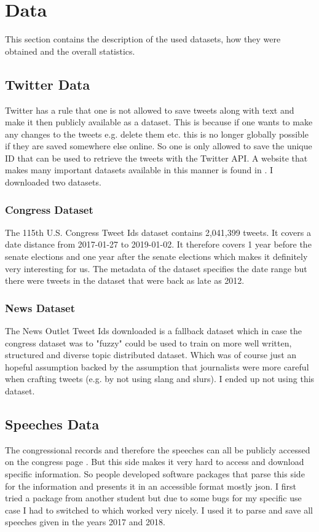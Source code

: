 \documentclass[10pt,conference,compsocconf]{IEEEtran}
\begin{document}
\section{Data}
\label{sec:Data}
This section contains the description of the used datasets, how they were obtained and the overall statistics. 
\subsection{Twitter Data}
Twitter has a rule that one is not allowed to save tweets along with text and make it then publicly available as a dataset. This is because if one wants to make any changes to the tweets e.g. delete them etc. this is no longer globally possible if they are saved somewhere else online. So one is only allowed to save the unique ID that can be used to retrieve the tweets with the Twitter API. A website that makes many important datasets available in this manner is found in  \cite{twitter_datasets}. I downloaded two datasets.
\subsubsection{Congress Dataset}
The 115th U.S. Congress Tweet Ids dataset contains 2,041,399 tweets. It covers a date distance from 2017-01-27 to 2019-01-02. It therefore covers 1 year before the senate elections and one year after the senate elections which makes it definitely very interesting for us. The metadata of the dataset specifies the date range but there were tweets in the dataset that were back as late as 2012. 
\subsubsection{News Dataset}
The News Outlet Tweet Ids downloaded is a fallback dataset which in case the congress dataset was to "fuzzy" could be used to train on more well written, structured and diverse topic distributed dataset. Which was of course just an hopeful assumption backed by the assumption that journalists were more careful when crafting tweets (e.g. by not using slang and slurs). I ended up not using this dataset. 
\subsection{Speeches Data}
The congressional records and therefore the speeches can all be publicly accessed on the congress page \cite{congress_page}. But this side makes it very hard to access and download specific information. So people developed software packages that parse this side for the information and presents it in an accessible format mostly json. I first tried a package from another student but due to some bugs for my specific use case I had to switched to \cite{congress-downloader} which worked very nicely. I used it to parse and save all speeches given in the years 2017 and 2018.
\end{document}
